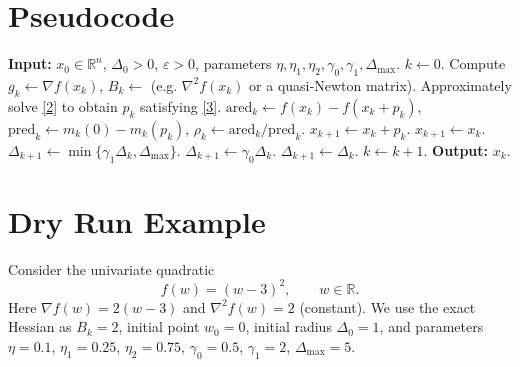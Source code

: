 \documentclass{article}
\newcommand{\norm}[1]{\left\lVert#1\right\rVert}
\newcommand{\RR}{\mathbb{R}}
\begin{document}
\section*{Pseudocode}
\begin{algorithm}[H]
\caption{Trust Region with Approximate Subproblem Solver}
\begin{algorithmic}[1]
\State \textbf{Input:} $x_{0}\in\RR^{n}$, $\Delta_{0}>0$, $\varepsilon>0$,
parameters $\eta,\eta_{1},\eta_{2},\gamma_{0},\gamma_{1},\Delta_{\max}$.
\State $k\gets0$.
\While{$\norm{\nabla f(x_{k})}> \varepsilon$}
    \State Compute $g_{k}\gets\nabla f(x_{k})$, $B_{k}\gets$ (e.g. $\nabla^{2}f(x_{k})$ or a quasi‑Newton matrix).
    \State Approximately solve \eqref{2} to obtain $p_{k}$ satisfying \eqref{3}.
    \State $\text{ared}_{k}\gets f(x_{k})-f(x_{k}+p_{k})$,
          $\text{pred}_{k}\gets m_{k}(0)-m_{k}(p_{k})$,
          $\rho_{k}\gets \text{ared}_{k}/\text{pred}_{k}$.
        \State $x_{k+1}\gets x_{k}+p_{k}$.
    \Else
        \State $x_{k+1}\gets x_{k}$.
    \EndIf
        \State $\Delta_{k+1}\gets \min\{\gamma_{1}\Delta_{k},\Delta_{\max}\}$.
        \State $\Delta_{k+1}\gets \gamma_{0}\Delta_{k}$.
    \Else
        \State $\Delta_{k+1}\gets \Delta_{k}$.
    \EndIf
    \State $k\gets k+1$.
\EndWhile
\State \textbf{Output:} $x_{k}$.
\end{algorithmic}
\end{algorithm}

\section*{Dry Run Example}
Consider the univariate quadratic
\[
f(w)= (w-3)^{2},\qquad w\in\RR.
\]
Here $\nabla f(w)=2(w-3)$ and $\nabla^{2}f(w)=2$ (constant).  
We use the exact Hessian as $B_{k}=2$, initial point $w_{0}=0$, initial radius $\Delta_{0}=1$, and parameters
$\eta=0.1$, $\eta_{1}=0.25$, $\eta_{2}=0.75$, $\gamma_{0}=0.5$, $\gamma_{1}=2$, $\Delta_{\max}=5$.
\end{document}
